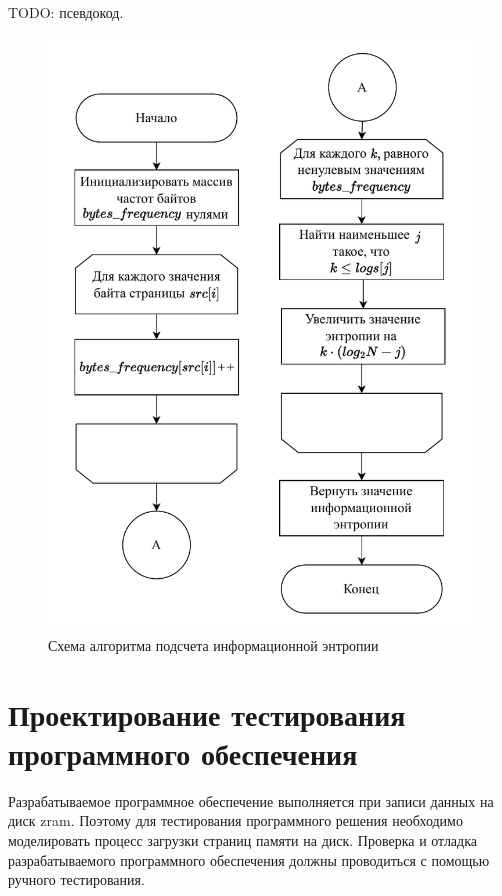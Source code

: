TODO: псевдокод.

\begin{figure}[H]
	\begin{center}
		\includegraphics[scale=0.7]{inc/img/get-entropy.pdf}
	\end{center}
	\captionsetup{justification=centering}
	\caption{Схема алгоритма подсчета информационной энтропии}
	\label{img:get-entropy}
\end{figure}

\section{Проектирование тестирования программного обеспечения}

Разрабатываемое программное обеспечение выполняется при записи данных на диск zram. Поэтому для тестирования программного решения необходимо моделировать процесс загрузки страниц памяти на диск. Проверка и отладка разрабатываемого программного обеспечения должны проводиться с помощью ручного тестирования. 

